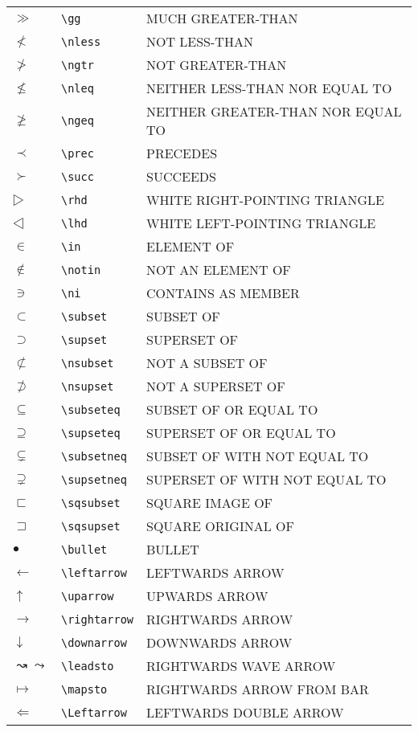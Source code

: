 \begin{center}
\begin{xtabular}{|ll>{\smaller\ttfamily}l|}
  $≫$ & \verb|\gg| & MUCH GREATER-THAN \\
  $≮$ & \verb|\nless| & NOT LESS-THAN \\
  $≯$ & \verb|\ngtr| & NOT GREATER-THAN \\
  $≰$ & \verb|\nleq| & NEITHER LESS-THAN NOR EQUAL TO \\
  $≱$ & \verb|\ngeq| & NEITHER GREATER-THAN NOR EQUAL TO \\
  $≺$ & \verb|\prec| & PRECEDES \\
  $≻$ & \verb|\succ| & SUCCEEDS \\
  $▷$ & \verb|\rhd| & WHITE RIGHT-POINTING TRIANGLE \\
  $◁$ & \verb|\lhd| & WHITE LEFT-POINTING TRIANGLE \\
  $∈$ & \verb|\in| & ELEMENT OF \\
  $∉$ & \verb|\notin| & NOT AN ELEMENT OF \\
  $∋$ & \verb|\ni| & CONTAINS AS MEMBER \\
  $⊂$ & \verb|\subset| & SUBSET OF \\
  $⊃$ & \verb|\supset| & SUPERSET OF \\
  $⊄$ & \verb|\nsubset| & NOT A SUBSET OF \\
  $⊅$ & \verb|\nsupset| & NOT A SUPERSET OF \\
  $⊆$ & \verb|\subseteq| & SUBSET OF OR EQUAL TO \\
  $⊇$ & \verb|\supseteq| & SUPERSET OF OR EQUAL TO \\
  $⊊$ & \verb|\subsetneq| & SUBSET OF WITH NOT EQUAL TO \\
  $⊋$ & \verb|\supsetneq| & SUPERSET OF WITH NOT EQUAL TO \\
  $⊏$ & \verb|\sqsubset| & SQUARE IMAGE OF \\
  $⊐$ & \verb|\sqsupset| & SQUARE ORIGINAL OF \\
  $•$ & \verb|\bullet| & BULLET \\
  $←$ & \verb|\leftarrow| & LEFTWARDS ARROW \\
  $↑$ & \verb|\uparrow| & UPWARDS ARROW \\
  $→$ & \verb|\rightarrow| & RIGHTWARDS ARROW \\
  $↓$ & \verb|\downarrow| & DOWNWARDS ARROW \\
  $↝\leadsto$ & \verb|\leadsto| & RIGHTWARDS WAVE ARROW \\
  $↦$ & \verb|\mapsto| & RIGHTWARDS ARROW FROM BAR \\
  $⇐$ & \verb|\Leftarrow| & LEFTWARDS DOUBLE ARROW \\

\end{xtabular}
\end{center}
